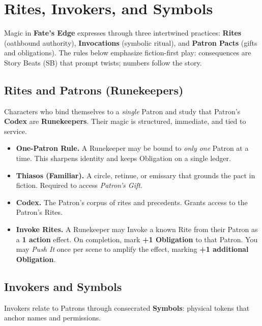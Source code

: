 
\section{Rites, Invokers, and Symbols}
\label{sec:rites}

Magic in \textbf{Fate's Edge} expresses through three intertwined practices: \textbf{Rites} (oathbound authority), \textbf{Invocations} (symbolic ritual), and \textbf{Patron Pacts} (gifts and obligations). The rules below emphasize fiction-first play: consequences are Story Beats (SB) that prompt twists; numbers follow the story.

\subsection{Rites and Patrons (Runekeepers)}
\label{subsec:runekeepers}
Characters who bind themselves to a \emph{single} Patron and study that Patron's \textbf{Codex} are \textbf{Runekeepers}. Their magic is structured, immediate, and tied to service.

\begin{itemize}
  \item \textbf{One-Patron Rule.} A Runekeeper may be bound to \emph{only one} Patron at a time. This sharpens identity and keeps Obligation on a single ledger.
  \item \textbf{Thiasos (Familiar).} A circle, retinue, or emissary that grounds the pact in fiction. Required to access \emph{Patron's Gift}.
  \item \textbf{Codex.} The Patron's corpus of rites and precedents. Grants access to the Patron's Rites.
  \item \textbf{Invoke Rites.} A Runekeeper may Invoke a known Rite from their Patron as a \textbf{1 action} effect. On completion, mark \textbf{+1 Obligation} to that Patron. You may \emph{Push It} once per scene to amplify the effect, marking \textbf{+1 additional Obligation}.
\end{itemize}

\subsection{Invokers and Symbols}
\label{subsec:invokers}
Invokers relate to Patrons through consecrated \textbf{Symbols}: physical tokens that anchor names and permissions.


